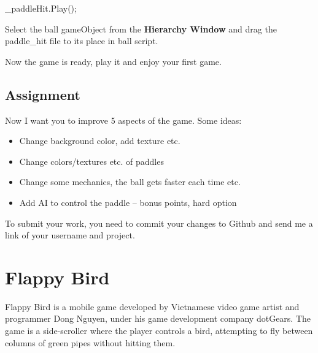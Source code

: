 \documentclass[
]{book}
\newenvironment{Shaded}{\begin{snugshade}}{\end{snugshade}}
\newcommand{\FunctionTok}[1]{\textcolor[rgb]{0.00,0.00,0.00}{#1}}
\newcommand{\NormalTok}[1]{#1}
\providecommand{\tightlist}{%
  \setlength{\itemsep}{0pt}\setlength{\parskip}{0pt}}
\begin{document}
\begin{Shaded}
\begin{Highlighting}[]
\NormalTok{_paddleHit.}\FunctionTok{Play}\NormalTok{();}
\end{Highlighting}
\end{Shaded}

Select the ball gameObject from the \textbf{Hierarchy Window} and drag the paddle\_hit file to its place in ball script.

Now the game is ready, play it and enjoy your first game.

\hypertarget{assignment}{%
\section{Assignment}\label{assignment}}

Now I want you to improve 5 aspects of the game. Some ideas:

\begin{itemize}
\tightlist
\item
  Change background color, add texture etc.
\item
  Change colors/textures etc. of paddles
\item
  Change some mechanics, the ball gets faster each time etc.
\item
  Add AI to control the paddle -- bonus points, hard option
\end{itemize}

To submit your work, you need to commit your changes to Github and send me a link of your username and project.

\hypertarget{flappy-bird}{%
\chapter{Flappy Bird}\label{flappy-bird}}

Flappy Bird is a mobile game developed by Vietnamese video game artist and programmer Dong Nguyen, under his game development company dotGears. The game is a side-scroller where the player controls a bird, attempting to fly between columns of green pipes without hitting them.
\end{document}
